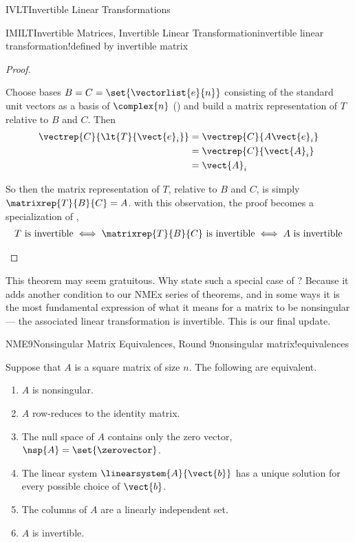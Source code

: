 \begin{subsect}{IVLT}{Invertible Linear Transformations}
\begin{theorem}{IMILT}{Invertible Matrices, Invertible Linear Transformation}{invertible linear transformation!defined by invertible matrix}
\end{theorem}
%
\begin{proof}
\begin{para}Choose bases $B=C=\set{\vectorlist{e}{n}}$ consisting of the standard unit vectors as a basis of $\complex{n}$ () and build a matrix representation of $T$ relative to $B$ and $C$.  Then
%
\begin{align*}
\vectrep{C}{\lt{T}{\vect{e}_i}}
&=\vectrep{C}{A\vect{e}_i}\\
%
&=\vectrep{C}{\vect{A}_i}\\
%
&=\vect{A}_i
\end{align*}
\end{para}
%
\begin{para}So then the matrix representation of $T$, relative to $B$ and $C$, is simply $\matrixrep{T}{B}{C}=A$.  with this observation, the proof becomes a specialization of ,
%
\begin{align*}
%
T\text{ is invertible}
\iff\matrixrep{T}{B}{C}\text{ is invertible}
\iff A\text{ is invertible}
\end{align*}
\end{para}
%
\end{proof}
%
\begin{para}This theorem may seem gratuitous.  Why state such a special case of ?  Because it adds another condition to our NMEx series of theorems, and in some ways it is the most fundamental expression of what it means for a matrix to be nonsingular --- the associated linear transformation is invertible.  This is our final update.\end{para}
%
\begin{theorem}{NME9}{Nonsingular Matrix Equivalences, Round 9}{nonsingular matrix!equivalences}
\begin{para}Suppose that $A$ is a square matrix of size $n$.  The following are equivalent.
%
\begin{enumerate}
\item $A$ is nonsingular.
\item $A$ row-reduces to the identity matrix.
\item The null space of $A$ contains only the zero vector, $\nsp{A}=\set{\zerovector}$.
\item The linear system $\linearsystem{A}{\vect{b}}$ has a unique solution for every possible choice of $\vect{b}$.
\item The columns of $A$ are a linearly independent set.
\item $A$ is invertible.

\end{enumerate}
\end{para}
\end{theorem}
\end{subsect}
